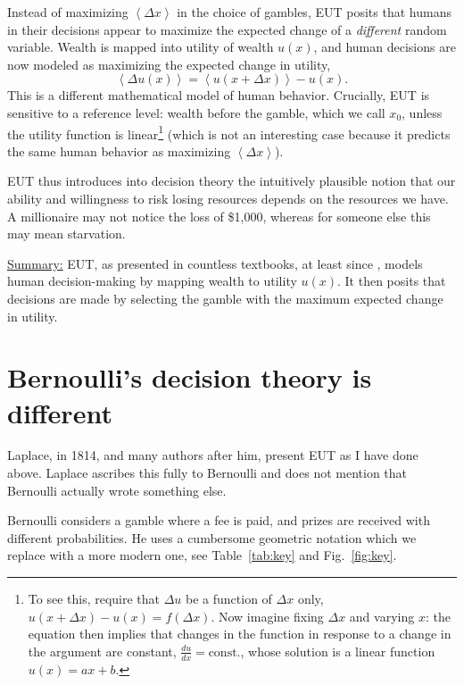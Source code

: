 \documentclass[pdftex]{article}
\newcommand{\ave}[1]{\left\langle#1 \right\rangle}
\newcommand{\elabel}[1]{\label{eq:#1}}
\newcommand{\tref}[1]{Table~\ref{tab:#1}}
\newcommand{\fref}[1]{Fig.~\ref{fig:#1}}
\newcommand{\seclabel}[1]{\label{section:#1}}
\newcommand{\be}{\begin{equation}}
\newcommand{\ee}{\end{equation}}
\newcommand{\Dx}{{\Delta x}}
\newcommand{\Du}{\Delta u}
\begin{document}
Instead of maximizing $\ave{\Dx}$ in the choice of gambles, EUT posits that humans in their decisions appear to maximize the expected change of a {\it different} random variable. Wealth is mapped into utility of wealth $u(x)$, and human decisions are now modeled as maximizing the expected change in utility, 
\be
\ave{\Du(x)}=\ave{u(x+\Dx)}-u(x).
\elabel{EUT}
\ee
This is a different mathematical model of human behavior. Crucially, EUT is sensitive to a reference level: wealth before the gamble, which we call $x_0$, unless the utility function is linear\footnote{To see this, require that $\Du$ be a function of $\Dx$ only, $u(x+\Dx)-u(x)=f(\Dx)$. Now imagine fixing $\Dx$ and varying $x$: the equation then implies that changes in the function in response to a change in the argument are constant, $\frac{du}{dx}=\text{const.}$, whose solution is a linear function $u(x)=ax+b$.} (which is not an interesting case because it predicts the same human behavior as maximizing $\ave{\Dx}$).

EUT thus introduces into decision theory the intuitively plausible notion that our ability and willingness to risk losing resources depends on the resources we have. A millionaire may not notice the loss of \$1,000, whereas for someone else this may mean starvation.

\underline{Summary:} EUT, as presented in countless textbooks, at least since \cite{Laplace1814}, models human decision-making by mapping wealth to utility $u(x)$. It then posits that decisions are made by selecting the gamble with the maximum expected change in utility.

\section{Bernoulli's decision theory is different}
\seclabel{Bernoullis}
Laplace, in 1814, and many authors after him, present EUT as I have done above. Laplace ascribes this fully to Bernoulli and does not mention that Bernoulli actually wrote something else. 

Bernoulli considers a gamble where a fee is paid, and prizes are received with different probabilities. He uses a cumbersome geometric notation which we replace with a more modern one, see \tref{key} and \fref{key}.
\end{document}
